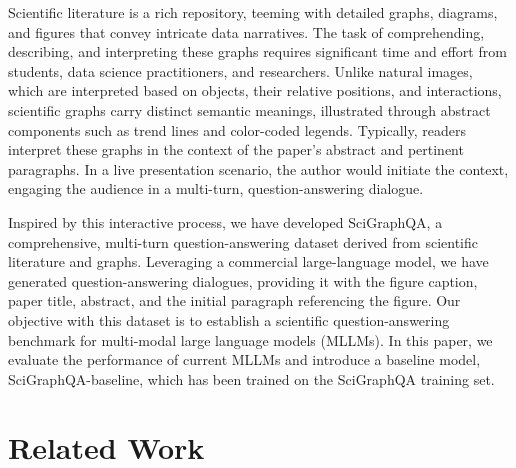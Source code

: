\documentclass{article}
\begin{document}
Scientific literature is a rich repository, teeming with detailed graphs, diagrams, and figures that convey intricate data narratives. The task of comprehending, describing, and interpreting these graphs requires significant time and effort from students, data science practitioners, and researchers. Unlike natural images, which are interpreted based on objects, their relative positions, and interactions, scientific graphs carry distinct semantic meanings, illustrated through abstract components such as trend lines and color-coded legends. Typically, readers interpret these graphs in the context of the paper's abstract and pertinent paragraphs. In a live presentation scenario, the author would initiate the context, engaging the audience in a multi-turn, question-answering dialogue.

Inspired by this interactive process, we have developed SciGraphQA, a comprehensive, multi-turn question-answering dataset derived from scientific literature and graphs. Leveraging a commercial large-language model, we have generated question-answering dialogues, providing it with the figure caption, paper title, abstract, and the initial paragraph referencing the figure. Our objective with this dataset is to establish a scientific question-answering benchmark for multi-modal large language models (MLLMs). In this paper, we evaluate the performance of current MLLMs and introduce a baseline model, SciGraphQA-baseline, which has been trained on the SciGraphQA training set.

\section{Related Work}
\end{document}
